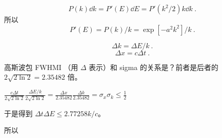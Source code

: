 
\begin{equation}
P(k)\dd{k} = P'(E)\dd{E} = P'(k^2/2)k\dd{k}~.
\end{equation}
所以
\begin{equation}
P'(E) = P(k)/k = \exp[-a^2 k^2]/k~.
\end{equation}

\begin{equation}
\Delta k = \Delta E/k~.
\end{equation}
\begin{equation}
\Delta x = c\Delta t~.
\end{equation}


高斯波包 FWHMI （用 $\Delta$ 表示）和 sigma 的关系是？前者是后者的 $2\sqrt{2\ln 2} = 2.35482$ 倍。

$\frac{c\Delta t}{2\sqrt{2\ln 2}}\frac{\Delta E/k}{2\sqrt{2\ln 2}} = \frac{\Delta x}{2.35482}\frac{\Delta k}{2.35482} = \sigma_x \sigma_k \leq \frac{1}{2}$

于是得到 $\Delta t\Delta E \leq 2.77258 k/c$。

所以
